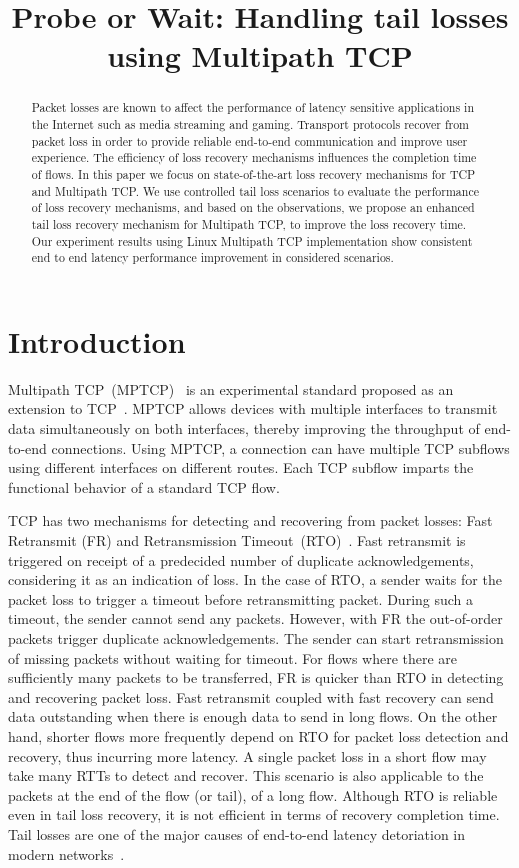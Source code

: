 \documentclass[10pt,conference]{IEEEtran}
\title{Probe or Wait: Handling tail losses using Multipath TCP}
\author{\IEEEauthorblockN{Kiran~Yedugundla, Per~Hurtig, Anna~Brunstrom}
\IEEEauthorblockA{Dept. of Computer Science, Karlstad University, Karlstad, Sweden\\
    \{name.surname\}@kau.se
}}
\begin{document}
\maketitle

\begin{abstract}
Packet losses are known to affect the performance of latency sensitive applications in the Internet such as media streaming and gaming. 
Transport protocols recover from packet loss in order to provide reliable end-to-end communication and improve user experience. The efficiency of 
loss recovery mechanisms influences the completion time of flows. In this paper we focus on state-of-the-art loss recovery mechanisms for TCP 
and Multipath TCP. We use controlled tail loss scenarios to evaluate the performance of loss recovery mechanisms, and based on the observations, 
we propose an enhanced tail loss recovery mechanism for Multipath TCP, to improve the loss recovery time. Our experiment results using Linux 
Multipath TCP implementation show consistent end to end latency performance improvement in considered scenarios. 
\end{abstract}

\section{Introduction}


Multipath TCP~(MPTCP)~\cite{rfc6824} is an experimental standard proposed as an extension to TCP~\cite{rfc793}. MPTCP allows devices with multiple interfaces to 
transmit data simultaneously on both interfaces, thereby improving the throughput of end-to-end connections. Using MPTCP, a connection can have 
multiple TCP subflows using different interfaces on different routes. Each TCP subflow imparts the functional behavior of a standard TCP flow. 

TCP has two mechanisms for detecting and recovering from packet losses: Fast Retransmit (FR) and Retransmission Timeout~(RTO)~\cite{Flach:2013}. 
Fast retransmit is triggered on receipt of a predecided number of duplicate acknowledgements, considering it as an indication of loss. In the case 
of RTO, a sender waits for the packet loss to trigger a timeout before retransmitting packet. During such a timeout, the sender cannot send any 
packets. However, with FR the out-of-order packets trigger duplicate acknowledgements. The sender can start retransmission of missing packets 
without waiting for timeout. For flows where there are sufficiently many packets to be transferred, FR is quicker than RTO in detecting and 
recovering packet loss. Fast retransmit coupled with fast recovery can send data outstanding when there is enough data to send in long flows. 
On the other hand, shorter flows more frequently depend on RTO for packet loss detection and recovery, thus incurring more latency. A single 
packet loss in a short flow may take many RTTs to detect and recover. This scenario is also applicable to the packets at the end of the flow 
(or tail), of a long flow. Although RTO is reliable even in tail loss recovery, it is not efficient in terms of recovery completion time. Tail 
losses are one of the major causes of end-to-end latency detoriation in modern networks~\cite{Flach:2013}. 
\end{document}
